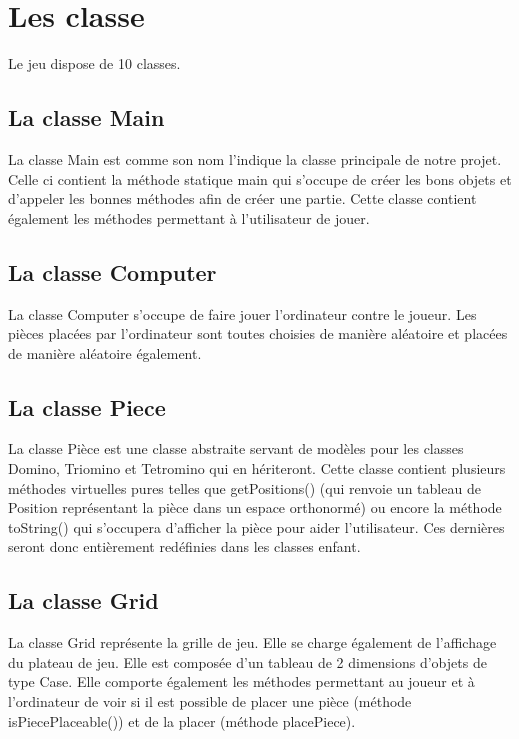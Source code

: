 \documentclass[a4paper, titlepage, french]{report}
\begin{document}
\chapter{Les classe}

Le jeu dispose de 10 classes.
\bigskip

\section{La classe Main}

La classe Main est comme son nom l'indique la classe principale de notre projet.
Celle ci contient la méthode statique main qui s'occupe de créer les bons objets et
d'appeler les bonnes méthodes afin de créer une partie.
Cette classe contient également les méthodes permettant à l'utilisateur de jouer.

\bigskip

\section{La classe Computer}

La classe Computer s'occupe de faire jouer l'ordinateur contre le joueur. Les pièces placées
par l'ordinateur sont toutes choisies de manière aléatoire et placées de manière aléatoire également.

\bigskip

\section{La classe Piece}

La classe Pièce est une classe abstraite servant de modèles pour les classes Domino, Triomino et Tetromino
qui en hériteront.
Cette classe contient plusieurs méthodes virtuelles pures telles que getPositions() (qui renvoie un tableau de Position représentant
la pièce dans un espace orthonormé) ou encore la méthode toString() qui s'occupera d'afficher la pièce pour aider
l'utilisateur. Ces dernières seront donc entièrement redéfinies dans les classes enfant.

\bigskip

\section{La classe Grid}

La classe Grid représente la grille de jeu. Elle se charge également de l'affichage du plateau de jeu.
Elle est composée d'un tableau de 2 dimensions d'objets de type Case.
Elle comporte également les méthodes permettant au joueur et à l'ordinateur de voir si il est possible de
placer une pièce (méthode isPiecePlaceable()) et de la placer (méthode placePiece).
\end{document}
